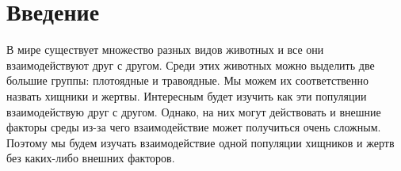 \section{Введение}
    В мире существует множество разных видов животных и все они взаимодействуют друг с другом. Среди этих животных можно выделить две большие группы: плотоядные и травоядные. Мы можем их соответственно назвать хищники и жертвы. Интересным будет изучить как эти популяции взаимодействую друг с другом. Однако, на них могут действовать и внешние факторы среды из-за чего взаимодействие может получиться очень сложным. Поэтому мы будем изучать взаимодействие одной популяции хищников и жертв без каких-либо внешних факторов. 